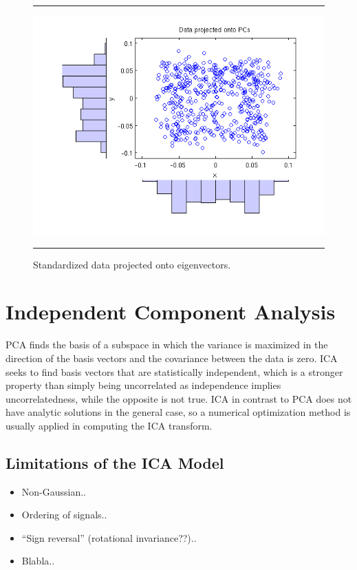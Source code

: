 \documentclass[11pt, oneside, a4paper]{report}
\begin{document}
\begin{figure}
  \centering
  \hrule
  \includegraphics[width = .9\textwidth]{Figures/pca_eig_projection}
  \hrule
  \caption{Standardized data projected onto eigenvectors.}
\end{figure}

\chapter{Independent Component Analysis}

PCA finds the basis of a subspace in which the variance is
maximized in the direction of the basis vectors and the covariance
between the data is zero. ICA seeks to find basis
vectors that are statistically independent, which is a stronger
property than simply being uncorrelated as independence implies
uncorrelatedness, while the opposite is not true. ICA in contrast to PCA does not have analytic solutions in the general case, 
so a numerical optimization method is usually applied in computing the ICA transform.

\section{Limitations of the ICA Model}\label{ICA_restrictions}

\begin{itemize}
  \item Non-Gaussian..
  \item Ordering of signals..
  \item ``Sign reversal'' (rotational invariance??)..
  \item Blabla..
\end{itemize}
\end{document}
